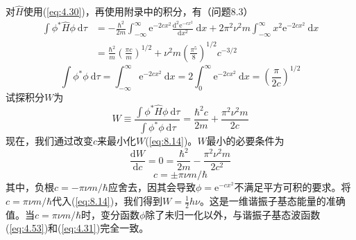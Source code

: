 \begin{examplebox}
        对$\hat{H}$使用(\ref{eq:4.30})，再使用附录中的积分，有（问题8.3）
        \begin{equation*}
            \begin{aligned}
                \int \phi^{\ast} \hat{H}\phi \:\mathrm{d}\tau &= -\frac{\hbar^2}{2m} \int_{-\infty}^{\infty} \mathrm{e}^{-2cx^2} \frac{\mathrm{d}^2\mathrm{e}^{-cx^2}}{\mathrm{d}x^2} \:\mathrm{d}x + 2\pi^2\nu^2m\int_{-\infty}^{\infty} x^2 \mathrm{e}^{-2cx^2} \:\mathrm{d}x \\
                &= \frac{\hbar^2}{m} \left(\frac{\pi c}{m}\right)^{1/2} + \nu^2m\left(\frac{\pi^5}{8}\right)^{1/2} c^{-3/2}
            \end{aligned}
        \end{equation*}
        \begin{equation*}
            \int \phi^{\ast} \phi \:\mathrm{d}\tau = \int_{-\infty}^{\infty} \mathrm{e}^{-2cx^2} \:\mathrm{d}x = 2\int_{0}^{\infty} \mathrm{e}^{-2cx^2} \:\mathrm{d}x = \left(\frac{\pi}{2c}\right)^{1/2}
        \end{equation*}
        试探积分$W$为
        \begin{equation}
            W \equiv \frac{\int \phi^{\ast} \hat{H}\phi \:\mathrm{d}\tau}{\int \phi^{\ast} \phi \:\mathrm{d}\tau} = \frac{\hbar^2c}{2m} + \frac{\pi^2\nu^2m}{2c}
            \label{eq:8.14}
        \end{equation}
        现在，我们通过改变$c$来最小化$W$(\ref{eq:8.14})。$W$最小的必要条件为
        \begin{equation*}
            \frac{\mathrm{d} W}{\mathrm{d} c} = 0 = \frac{\hbar^2}{2m} - \frac{\pi^2\nu^2m}{2c^2}
        \end{equation*}
        \begin{equation}
            c = \pm \pi \nu m/\hbar
            \label{eq:8.15}
        \end{equation}
        其中，负根$c = -\pi\nu m/\hbar$应舍去，因其会导致$\phi = \mathrm{e}^{-cx^2}$不满足平方可积的要求。将$c = \pi\nu m/\hbar$代入(\ref{eq:8.14})，我们得到$W = \frac{1}{2}h\nu$。这是一维谐振子基态能量的准确值。当$c = \pi\nu m/\hbar$时，变分函数$\phi$除了未归一化以外，与谐振子基态波函数(\ref{eq:4.53})和(\ref{eq:4.31})完全一致。


\end{examplebox}
